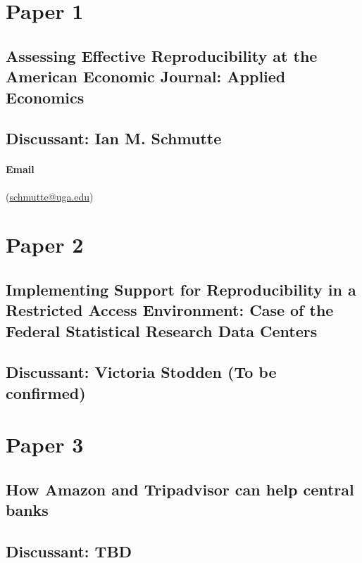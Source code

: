 \documentclass[10pt]{article}
\newcommand{\ehref}[1]{(\href{mailto:#1}{#1})}
\newcommand{\email}[1]{\ehref{#1}}
\begin{document}
\section{Paper 1}
\subsection{Assessing Effective Reproducibility at the American Economic Journal: Applied Economics}
\label{sec:paper1}

\subsection{Discussant: Ian M. Schmutte}
\paragraph{Email} \email{schmutte@uga.edu}

\newpage
\section{Paper 2}
\subsection{Implementing Support for Reproducibility in a Restricted Access Environment: Case of the Federal Statistical Research Data Centers}
\label{sec:paper2}

\subsection{Discussant: Victoria Stodden (To be confirmed)}

\newpage
\section{Paper 3}
\subsection{How Amazon and Tripadvisor can help central banks }
\label{sec:paper3}

\subsection{Discussant: TBD}


	\singlespacing
%	
%	

%
\end{document}
